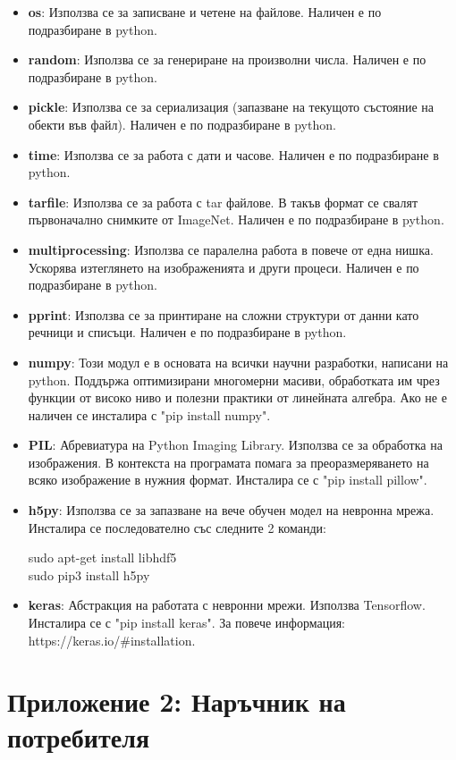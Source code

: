 \begin{itemize}
\item \textbf{os}: Използва се за записване и четене на файлове. Наличен е по подразбиране в python.
\item \textbf{random}: Използва се за генериране на произволни числа. Наличен е по подразбиране в python.
\item \textbf{pickle}: Използва се за сериализация (запазване на текущото състояние на обекти във файл). Наличен е по подразбиране в python. 
\item \textbf{time}: Използва се за работа с дати и часове. Наличен е по подразбиране в python.
\item \textbf{tarfile}: Използва се за работа с tar файлове. В такъв формат се свалят първоначално снимките от ImageNet. Наличен е по подразбиране в python.
\item \textbf{multiprocessing}: Използва се паралелна работа в повече от една нишка. Ускорява изтеглянето на изображенията и други процеси. Наличен е по подразбиране в python.
\item \textbf{pprint}: Използва се за принтиране на сложни структури от данни като речници и списъци. Наличен е по подразбиране в python.
\item \textbf{numpy}: Този модул е в основата на всички научни разработки, написани на python. Поддържа оптимизирани многомерни масиви, обработката им чрез функции от високо ниво и полезни практики от линейната алгебра. Ако не е наличен се инсталира с "pip install numpy".
\item \textbf{PIL}: Абревиатура на Python Imaging Library. Използва се за обработка на изображения. В контекста на програмата помага за преоразмеряването на всяко изображение в нужния формат. Инсталира се с "pip install pillow".

\item \textbf{h5py}: Използва се за запазване на вече обучен модел на невронна мрежа. Инсталира се последователно със следните 2 команди:

sudo apt-get install libhdf5\\
sudo pip3 install h5py
\item \textbf{keras}: Абстракция на работата с невронни мрежи. Използва Tensorflow. Инсталира се с "pip install keras". За повече информация: https://keras.io/\#installation.
\end{itemize}

\section{Приложение 2: Наръчник на потребителя}


